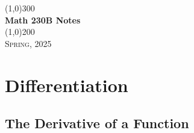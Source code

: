 \documentclass[a4paper, openany]{book}
\begin{document}
\begin{titlepage}
    \begin{center}
        \line(1,0){300} \\
        [0.25in]
        \huge{\bfseries Math 230B Notes} \\
        [2mm]
        \line(1,0){200} \\
        [1.5cm]
        \textsc{\LARGE Spring, 2025}
    \end{center}
\end{titlepage}

\tableofcontents
\setcounter{section}{0}

\chapter{Differentiation}

\section{The Derivative of a Function}

\newpage
\end{document}
